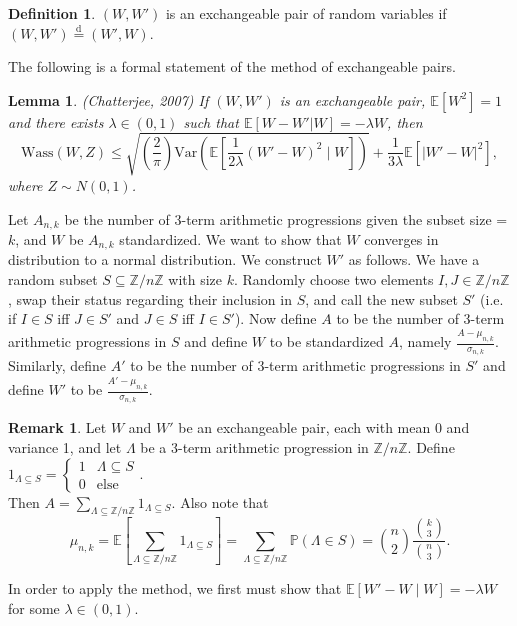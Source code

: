 \documentclass[12pt]{article} %
\newcommand{\p}[1]{\left(#1\right)}
\newcommand{\s}[1]{\left[#1\right]}
\newcommand{\abs}[1]{\left\lvert#1\right\rvert}
\newcommand{\Var}{\mathrm{Var}}
\newcommand{\Wass}{\mathrm{Wass}}
\renewcommand{\P}{\mathbb{P}}
\newcommand{\E}{\mathbb{E}}
\newcommand{\Z}{\mathbb{Z}}
\newtheorem{lem}[thm]{Lemma}
\theoremstyle{definition}
\newtheorem{defn}[thm]{Definition}
\theoremstyle{definition}
\newtheorem{remark}[thm]{Remark}
\begin{document}
\begin{defn}
$(W,W')$ is an exchangeable pair of random variables if $(W,W') \overset{\mathrm{d}}= (W',W)$.
\end{defn}

The following is a formal statement of the method of exchangeable pairs.

\begin{lem}{(Chatterjee, 2007)}
If $(W,W')$ is an exchangeable pair, $\E[W^2] = 1$ and there exists $\lambda \in (0,1)$ such that $\E[W-W'|W] = -\lambda W$, then 
\[\Wass(W,Z) \leq \sqrt{\p{\frac{2}{\pi}}\Var\p{\E\s{\frac{1}{2\lambda}(W'-W)^2 \mid W}}} + \frac{1}{3\lambda}\E[\abs{W'-W}^2],\]
where $Z \sim N(0,1)$.
\end{lem}


Let $A_{n,k}$ be the number of 3-term arithmetic progressions given the subset size = $k$, and $W$ be $A_{n,k}$ standardized. We want to show that $W$ converges in distribution to a normal distribution. We construct $W'$ as follows. We have a random subset $S \subseteq \Z / n\Z$ with size $k$. Randomly choose two elements $I,J \in \Z / n\Z$, swap their status regarding their inclusion in $S$, and call the new subset $S'$ (i.e. if $I \in S$ iff $J \in S'$ and $J \in S$ iff $I \in S'$). Now define $A$ to be the number of 3-term arithmetic progressions in $S$ and define $W$ to be standardized $A$, namely $\frac{A-\mu_{n,k}}{\sigma_{n,k}}$. Similarly, define $A'$ to be the number of 3-term arithmetic progressions in $S'$ and define $W'$ to be $\frac{A'-\mu_{n,k}}{\sigma_{n,k}}$.

\begin{remark}
Let $W$ and $W'$ be an exchangeable pair, each with mean 0 and variance 1, and let $\Lambda$ be a 3-term arithmetic progression in $\Z / n\Z$. Define $1_{\Lambda \subseteq S} = 
\begin{cases} 
      1 & \Lambda \subseteq S \\
      0 & \text{else}
\end{cases}$. \\
Then $A = \sum_{\Lambda \subseteq \Z / n\Z} 1_{\Lambda \subseteq S}$. Also note that
\[ \mu_{n,k} = \E[\sum_{\Lambda \subseteq \Z / n\Z} 1_{\Lambda \subseteq S}] = \sum_{\Lambda \subseteq \Z / n\Z} \P(\Lambda \in S) = \binom{n}{2}\frac{\binom{k}{3}}{\binom{n}{3}}. \]
\end{remark}

In order to apply the method, we first must show that $\E[W'-W \mid W] = -\lambda W$ for some $\lambda \in (0,1)$. 
\end{document}
